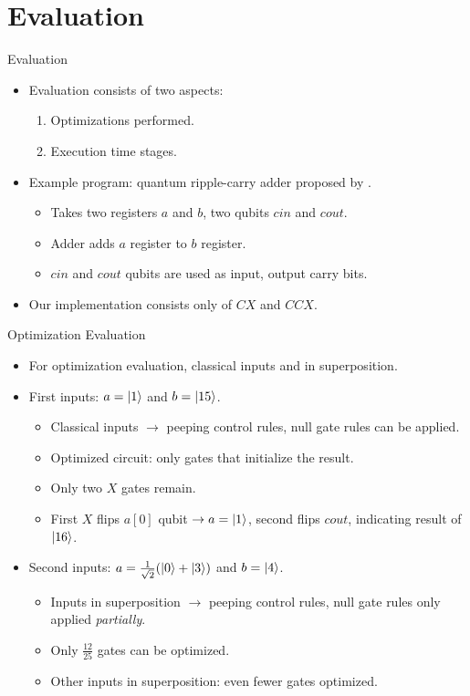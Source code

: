 \section{Evaluation}
\begin{frame}{Evaluation}
    \begin{itemize}
        \item Evaluation consists of two aspects:
        \begin{enumerate}
            \item Optimizations performed.
            \item Execution time stages.
        \end{enumerate}
        \item Example program: quantum ripple-carry adder proposed by \cite{CDKM04}.
        \begin{itemize}
            \item Takes two registers $a$ and $b$, two qubits $cin$ and $cout$.
            \item Adder adds $a$ register to $b$ register.
            \item $cin$ and $cout$ qubits are used as input, output carry bits.
        \end{itemize}
        \item Our implementation consists only of $CX$ and $CCX$.
    \end{itemize}
\end{frame}

\begin{frame}{Optimization Evaluation}
    \begin{itemize}
        \item For optimization evaluation, classical inputs and in superposition.
        \item First inputs: $a = \ket{1}$ and $b = \ket{15}$.
        \begin{itemize}
            \item Classical inputs $\to$ peeping control rules, null gate rules can be applied.
            \item Optimized circuit: only gates that initialize the result.
            \item Only two $X$ gates remain. 
            \item First $X$ flips $a[0]$ qubit $\to a = \ket{1}$, second flips $cout$, indicating result of $\ket{16}$.
        \end{itemize}
        \item Second inputs: $a = \frac{1}{\sqrt{2}} (\ket{0} + \ket{3})$ and $b = \ket{4}$.
        \begin{itemize}
            \item Inputs in superposition $\to$ peeping control rules, null gate rules only applied \emph{partially}.
            \item Only $\frac{12}{25}$ gates can be optimized.
            \item Other inputs in superposition: even fewer gates optimized.
        \end{itemize}
    \end{itemize}
\end{frame}

